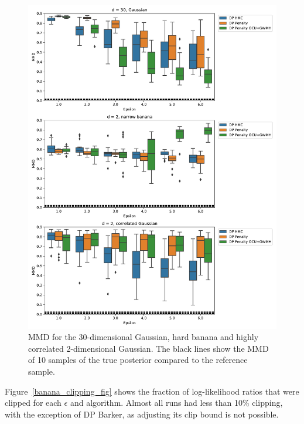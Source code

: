 \documentclass[english,twoside,openright]{HYgraduMLDS}
\begin{document}
\begin{figure}
  \centering
  \includegraphics[width=\textwidth]{figures/banana_extra.pdf}
  \caption{
    MMD for the 30-dimensional Gaussian, hard banana and highly correlated
    2-dimensional Gaussian. The black lines show the MMD of 10 samples of the
    true posterior compared to the reference sample.
  }
  \label{banana_extra_mmd_fig}
\end{figure}

Figure~\ref{banana_clipping_fig} shows the fraction of log-likelihood ratios
that were clipped for each \(\epsilon\) and algorithm. Almost all runs had
less than 10\% clipping, with the exception of DP Barker, as adjusting its
clip bound is not possible.
\end{document}

